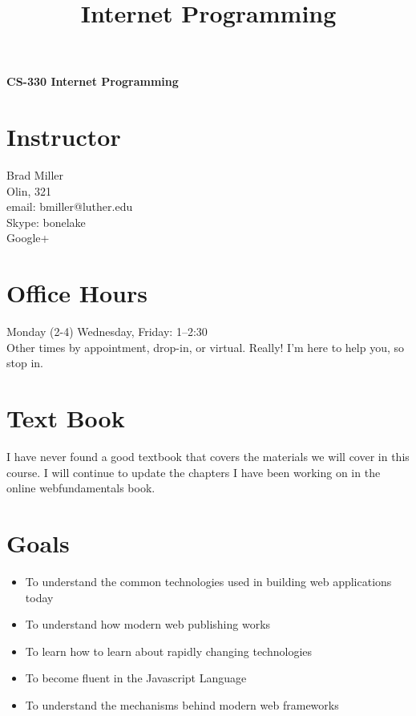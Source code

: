 \documentclass[11pt,twocolumn]{article}
\title{Internet Programming}
\author{}
\begin{document}
\begin{center}
	{\sffamily\LARGE\bfseries CS-330 Internet Programming}
\end{center}

\section*{Instructor}
Brad Miller \\
Olin, 321 \\
email:  bmiller@luther.edu \\
Skype:  bonelake \\
Google+ \\

\section*{Office Hours}
Monday (2-4) Wednesday, Friday: 1--2:30 \\
Other times by appointment, drop-in, or virtual.  Really! I'm here to help you, so stop in.

\section*{Text Book}

I have never found a good textbook that covers the materials we will cover in this course.  I will continue to update the chapters I have been working on in the online webfundamentals book.

\section*{Goals}

\begin{itemize}
    \item To understand the common technologies used in building web applications today
    \item To understand how modern web publishing works
    \item To learn how to learn about rapidly changing technologies
    \item To become fluent in the Javascript Language
    \item To understand the mechanisms behind modern web frameworks
\end{itemize}
\end{document}
